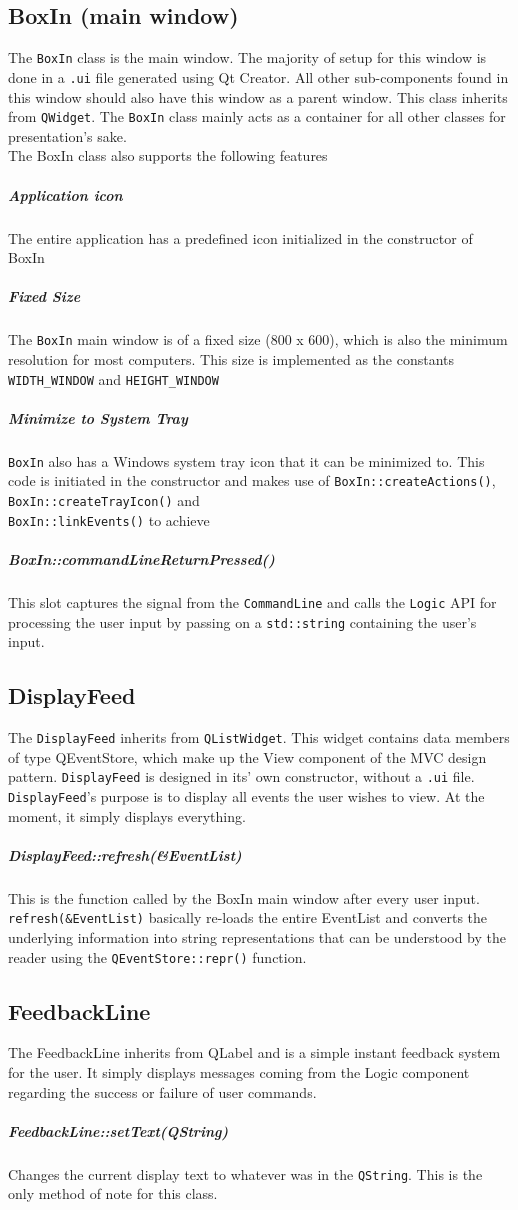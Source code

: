 \documentclass[12pt]{extarticle}
\begin{document}
\subsection{BoxIn (main window)}
The \texttt{BoxIn} class is the main window. The majority of setup for this window is done in a \texttt{.ui} file generated using Qt Creator. All other sub-components found in this window should also have this window as a parent window. This class inherits from \texttt{QWidget}. The \texttt{BoxIn} class mainly acts as a container for all other classes for presentation's sake.\\
The BoxIn class also  supports the following features
\subparagraph{Application icon}
The entire application has a predefined icon initialized in the constructor of BoxIn
\pagebreak
\subparagraph{Fixed Size}
The \texttt{BoxIn} main window is of a fixed size (800 x 600), which is also the minimum resolution for most computers. This size is implemented as the constants \texttt{WIDTH\_WINDOW} and \texttt{HEIGHT\_WINDOW}
\subparagraph{Minimize to System Tray}
\texttt{BoxIn} also has a Windows system tray icon that it can be minimized to. This code is initiated in the constructor and makes use of \texttt{BoxIn::createActions()}, \texttt{BoxIn::createTrayIcon()} and\\ \texttt{BoxIn::linkEvents()} to achieve
\subparagraph{BoxIn::commandLineReturnPressed()}This slot captures the signal from the \texttt{CommandLine} and calls the \texttt{Logic} API for processing the user input by passing on a \texttt{std::string} containing the user's input.
\subsection{DisplayFeed}
The \texttt{DisplayFeed} inherits from \texttt{QListWidget}. This widget contains data members of type QEventStore, which make up the View component of the MVC design pattern. \texttt{DisplayFeed} is designed in its' own constructor, without a \texttt{.ui} file. \texttt{DisplayFeed}'s purpose is to display all events the user wishes to view. At the moment, it simply displays everything.
\subparagraph{DisplayFeed::refresh(\&EventList)} This is the function called by the BoxIn main window after every user input. \texttt{refresh(\&EventList)} basically re-loads the entire EventList and converts the underlying information into string representations that can be understood by the reader using the \texttt{QEventStore::repr()} function.

\subsection{FeedbackLine}
The FeedbackLine inherits from QLabel and is a simple instant feedback system for the user. It simply displays messages coming from the Logic component regarding the success or failure of user commands.
\subparagraph{FeedbackLine::setText(QString)} Changes the current display text to whatever was in the \texttt{QString}. This is the only method of note for this class.
\end{document}
